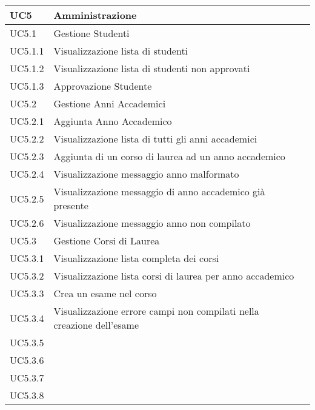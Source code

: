 \documentclass[AnalisiDeiRequisiti.tex]{subfiles}
\begin{document}
\begin{longtable}[H]{|p{2cm}|p{5cm}|p{5cm}|}
	UC5 & Amministrazione &  \\ \hline
	UC5.1 & Gestione Studenti &  \\ \hline
	UC5.1.1 & Visualizzazione lista di studenti &  \\ \hline
	UC5.1.2 & Visualizzazione lista di studenti non approvati &  \\ \hline
	UC5.1.3 & Approvazione Studente &  \\ \hline
	UC5.2 & Gestione Anni Accademici &  \\ \hline
	UC5.2.1 & Aggiunta Anno Accademico &  \\ \hline
	UC5.2.2 & Visualizzazione lista di tutti gli anni accademici &  \\ \hline
	UC5.2.3 & Aggiunta di un corso di laurea ad un anno accademico &  \\ \hline
	UC5.2.4 & Visualizzazione messaggio anno malformato &  \\ \hline
	UC5.2.5 & Visualizzazione messaggio di anno accademico già presente &  \\ \hline
	UC5.2.6 & Visualizzazione messaggio anno non compilato &  \\ \hline
	UC5.3 & Gestione Corsi di Laurea &  \\ \hline
	UC5.3.1 & Visualizzazione lista completa dei corsi &  \\ \hline
	UC5.3.2 & Visualizzazione lista corsi di laurea per anno accademico &  \\ \hline
	UC5.3.3 & Crea un esame nel corso &  \\ \hline
	UC5.3.4 & Visualizzazione errore campi non compilati nella creazione dell'esame &  \\ \hline
	UC5.3.5 &  &  \\ \hline
	UC5.3.6 &  &  \\ \hline
	UC5.3.7 &  &  \\ \hline
	UC5.3.8 &  &  \\ \hline
	

\end{longtable}
\end{document}
